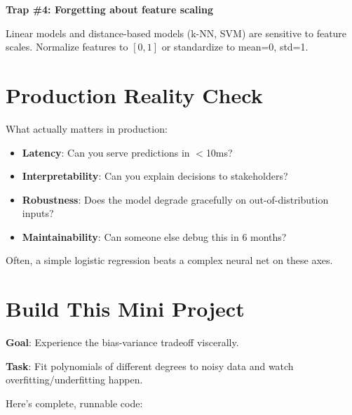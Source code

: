 \documentclass[11pt,oneside]{book}
\begin{document}
\textbf{Trap \#4: Forgetting about feature scaling}

Linear models and distance-based models (k-NN, SVM) are sensitive to feature scales. Normalize features to $[0,1]$ or standardize to mean=0, std=1.

\section{Production Reality Check}

What actually matters in production:

\begin{itemize}
    \item \textbf{Latency}: Can you serve predictions in $<$10ms?
    \item \textbf{Interpretability}: Can you explain decisions to stakeholders?
    \item \textbf{Robustness}: Does the model degrade gracefully on out-of-distribution inputs?
    \item \textbf{Maintainability}: Can someone else debug this in 6 months?
\end{itemize}

Often, a simple logistic regression beats a complex neural net on these axes.

\section{Build This Mini Project}

\textbf{Goal}: Experience the bias-variance tradeoff viscerally.

\textbf{Task}: Fit polynomials of different degrees to noisy data and watch overfitting/underfitting happen.

Here's complete, runnable code:
\end{document}
